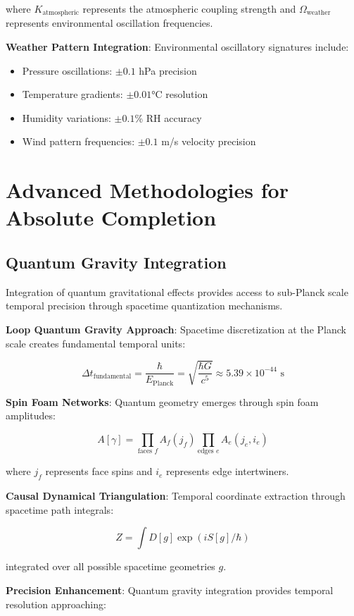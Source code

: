 \documentclass[11pt]{article}
\theoremstyle{remark}
\begin{document}
where $K_{\text{atmospheric}}$ represents the atmospheric coupling strength and $\Omega_{\text{weather}}$ represents environmental oscillation frequencies.

\textbf{Weather Pattern Integration}: Environmental oscillatory signatures include:
\begin{itemize}
\item Pressure oscillations: $\pm 0.1$ hPa precision
\item Temperature gradients: $\pm 0.01$°C resolution
\item Humidity variations: $\pm 0.1$\% RH accuracy
\item Wind pattern frequencies: $\pm 0.1$ m/s velocity precision
\end{itemize}

\section{Advanced Methodologies for Absolute Completion}

\subsection{Quantum Gravity Integration}

Integration of quantum gravitational effects provides access to sub-Planck scale temporal precision through spacetime quantization mechanisms.

\textbf{Loop Quantum Gravity Approach}: Spacetime discretization at the Planck scale creates fundamental temporal units:

$$\Delta t_{\text{fundamental}} = \frac{\hbar}{E_{\text{Planck}}} = \sqrt{\frac{\hbar G}{c^5}} \approx 5.39 \times 10^{-44} \text{ s}$$

\textbf{Spin Foam Networks}: Quantum geometry emerges through spin foam amplitudes:

$$A[\gamma] = \prod_{\text{faces } f} A_f(j_f) \prod_{\text{edges } e} A_e(j_e,i_e)$$

where $j_f$ represents face spins and $i_e$ represents edge intertwiners.

\textbf{Causal Dynamical Triangulation}: Temporal coordinate extraction through spacetime path integrals:

$$Z = \int D[g] \exp(iS[g]/\hbar)$$

integrated over all possible spacetime geometries $g$.

\textbf{Precision Enhancement}: Quantum gravity integration provides temporal resolution approaching:
\end{document}
